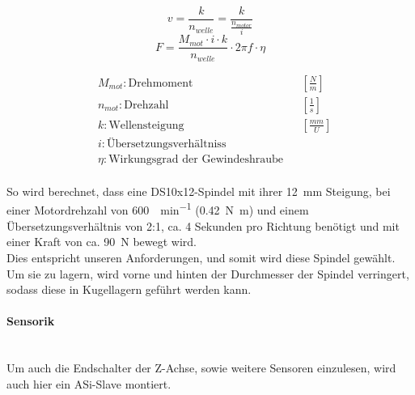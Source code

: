 \vspace{5mm}
\noindent\begin{minipage}{\textwidth}
\begin{minipage}[t]{0.5\textwidth}
    \vspace{10mm}
    \begin{equation*}
        v = \frac{k}{n_{welle}} = \frac{k}{\frac{n_{motor}}{i}}
    \end{equation*}
    \begin{equation*}
        F = \frac{M_{mot} \cdot i \cdot k}{n_{welle}} \cdot 2 \pi f \cdot \eta 
    \end{equation*}
\end{minipage}%
\begin{minipage}[t]{0.5\textwidth}
    \vspace{-7mm}
    \begin{align*}
        &M_{mot}: \text{Drehmoment} & &\left[\frac{N}{m}\right]\\
        &n_{mot}: \text{Drehzahl} & &\left[\frac{1}{s}\right]\\
        &k: \text{Wellensteigung} & &\left[\frac{mm}{U}\right]\\
        &i: \text{Übersetzungsverhältniss} & \\
        &\eta: \text{Wirkungsgrad der Gewindeshraube} & \\
    \end{align*}
\end{minipage}
\end{minipage}

\vspace{5mm}

So wird berechnet, dass eine DS10x12-Spindel mit ihrer \SI{12}{\mm} Steigung, bei einer Motordrehzahl von {\SI{600}{\Umdrehung\per\minute}} (\SI{0.42}{\newton\meter}) und einem Übersetzungsverhältnis von 2:1, ca. 4 Sekunden pro Richtung benötigt und mit einer Kraft von ca. \SI{90}{\newton} bewegt wird.\\
Dies entspricht unseren Anforderungen, und somit wird diese Spindel gewählt. Um sie zu lagern, wird vorne und hinten der Durchmesser der Spindel verringert, sodass diese in Kugellagern geführt werden kann.

\paragraph{Sensorik}\mbox{}\\
Um auch die Endschalter der Z-Achse, sowie weitere Sensoren einzulesen, wird auch hier ein ASi-Slave montiert.


